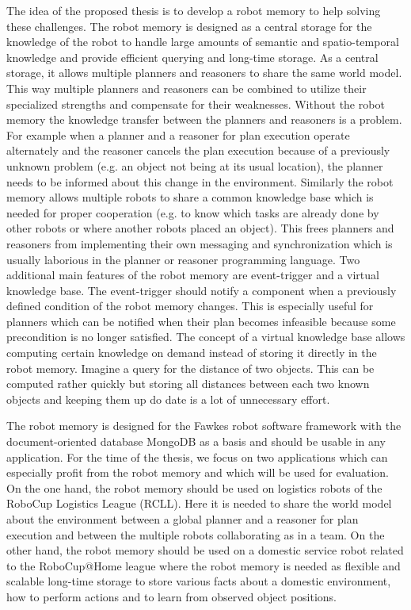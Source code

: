 \documentclass[a4paper,11pt]{article}
\begin{document}
The idea of the proposed thesis is to develop a robot memory to help
solving these challenges. The robot memory is designed as a central
storage for the knowledge of the robot to handle large amounts of
semantic and spatio-temporal knowledge and provide efficient querying
and long-time storage. As a central storage, it allows multiple
planners and reasoners to share the same world model. This way
multiple planners and reasoners can be combined to utilize their
specialized strengths and compensate for their weaknesses. Without the
robot memory the knowledge transfer between the planners and reasoners
is a problem. For example when a planner and a reasoner for plan
execution operate alternately and the reasoner cancels the plan
execution because of a previously unknown problem (e.g. an object not
being at its usual location), the planner needs to be informed about
this change in the environment. Similarly the robot memory allows
multiple robots to share a common knowledge base which is needed for
proper cooperation (e.g. to know which tasks are already done by other
robots or where another robots placed an object). This frees planners
and reasoners from implementing their own messaging and
synchronization which is usually laborious in the planner or reasoner
programming language. Two additional main features of the robot memory
are event-trigger and a virtual knowledge base. The event-trigger
should notify a component when a previously defined condition of the
robot memory changes. This is especially useful for planners which can
be notified when their plan becomes infeasible because some
precondition is no longer satisfied. The concept of a virtual
knowledge base allows computing certain knowledge on demand instead of
storing it directly in the robot memory. Imagine a query for the
distance of two objects. This can be computed rather quickly but
storing all distances between each two known objects and keeping them
up do date is a lot of unnecessary effort.

The robot memory is designed for the Fawkes robot software framework
with the document-oriented database MongoDB as a basis
and should be usable in any application. For the time of the thesis,
we focus on two applications which can especially profit from the
robot memory and which will be used for evaluation. On the one hand,
the robot memory should be used on logistics robots of the RoboCup
Logistics League (RCLL). Here it is needed to share the world model
about the environment between a global planner and a reasoner for plan
execution and between the multiple robots collaborating as in a
team. On the other hand, the robot memory should be used on a domestic
service robot related to the RoboCup@Home league where the robot
memory is needed as flexible and scalable long-time storage to store
various facts about a domestic environment, how to perform actions and
to learn from observed object positions.
\end{document}
